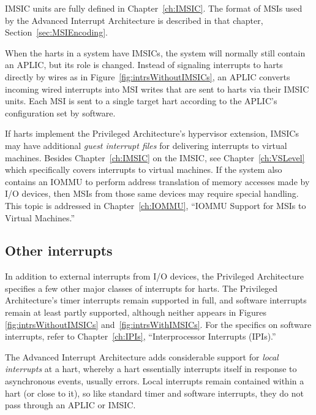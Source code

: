 IMSIC units are fully defined in Chapter~\ref{ch:IMSIC}.
The format of MSIs used by the {\RISCV} Advanced Interrupt Architecture
is described in that chapter, Section~\ref{sec:MSIEncoding}.

When the harts in a {\RISCV} system have IMSICs, the system will
normally still contain an APLIC, but its role is changed.
Instead of signaling interrupts to harts directly by wires as in
Figure~\ref{fig:intrsWithoutIMSICs}, an APLIC converts incoming
wired interrupts into MSI writes that are sent to harts via their IMSIC
units.
Each MSI is sent to a single target hart according to the APLIC's
configuration set by software.

If {\RISCV} harts implement the Privileged Architecture's hypervisor
extension, IMSICs may have additional \emph{guest interrupt files} for
delivering interrupts to virtual machines.
Besides Chapter~\ref{ch:IMSIC} on the IMSIC, see
Chapter~\ref{ch:VSLevel} which specifically covers interrupts to
virtual machines.
If the system also contains an \mbox{IOMMU} to perform address translation
of memory accesses made by I/O devices, then MSIs from those same
devices may require special handling.
This topic is addressed in Chapter~\ref{ch:IOMMU}, ``\mbox{IOMMU} Support
for MSIs to Virtual Machines.''

\subsection{Other interrupts}

In addition to external interrupts from I/O devices, the {\RISCV}
Privileged Architecture specifies a few other major classes of
interrupts for harts.
The Privileged Architecture's timer interrupts remain supported
in full, and software interrupts remain at least partly supported,
although neither appears in Figures \ref{fig:intrsWithoutIMSICs}
and~\ref{fig:intrsWithIMSICs}.
For the specifics on software interrupts, refer to
Chapter~\ref{ch:IPIs}, ``Interprocessor Interrupts (IPIs).''

The Advanced Interrupt Architecture adds considerable support
for \emph{local interrupts} at a hart, whereby a hart essentially
interrupts itself in response to asynchronous events, usually errors.
Local interrupts remain contained within a hart (or close to it),
so like standard {\RISCV} timer and software interrupts, they do not
pass through an APLIC or IMSIC.

